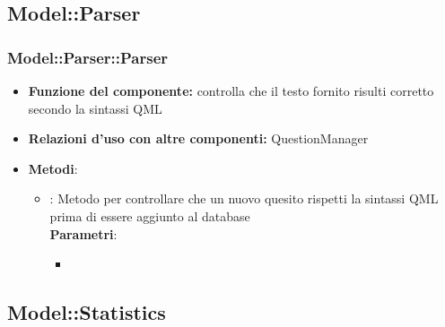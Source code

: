 \subsection{Model::Parser}
\subsubsection{Model::Parser::Parser}
\begin{itemize}
\item\textbf{Funzione del componente:} controlla che il testo fornito risulti corretto secondo la sintassi QML
\item\textbf{Relazioni d'uso con altre componenti:} QuestionManager\\
\item\textbf{Metodi}:
	\begin{itemize}
		\item{} : Metodo per controllare che un nuovo quesito rispetti la sintassi QML prima di essere aggiunto al database\\
		\textbf{Parametri}:
			\begin{itemize}
				\item{}\\
			\end{itemize}
	\end{itemize}
\end{itemize}

\subsection{Model::Statistics}
